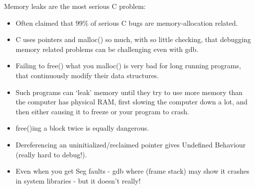 \documentclass[handout]{beamer}
\begin{document}
\begin{frame}[fragile]
    Memory leaks are the most serious C problem:
    \begin{itemize}
      \item
      Often claimed that
      \alert{99\% of serious C bugs are memory-allocation related}.
      \item
      C uses \alert{pointers and malloc()} so much, with
      so little checking, that debugging memory related
      problems can be challenging even with gdb.
    \pause
      \item
      Failing to \alert{free() what you malloc()} is
      very bad for long running programs, that
      continuously \alert{modify their data structures}.
    \pause
      \item
      Such programs can `leak' memory until they try to use more memory than
      the computer has physical RAM, first slowing the computer down a lot,
      and then either causing it to freeze or your program to crash.
    \pause
      \item
      \alert{free()ing a block twice} is equally dangerous.
    \pause
      \item
      \alert{Dereferencing} an uninitialized/reclaimed pointer
      gives \alert{Undefined Behaviour} (really hard to debug!).
    \pause
      \item
      Even when you get \alert{Seg faults} - \alert{gdb where} (frame stack)
      may show it crashes in system libraries - but it doesn't really!
    \end{itemize}
\end{frame}
\end{document}
